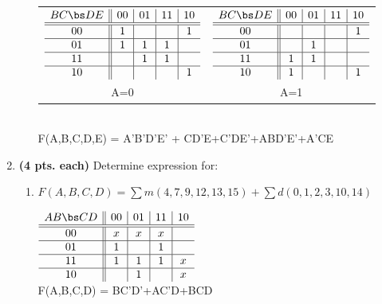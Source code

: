 \begin{enumerate}
\begin{enumerate}
\begin{solution}{
\begin{tabular}{cc}
$\begin{array} {c||c|c|c|c}
   B C \bs D E   & 00 & 01 & 11 & 10 \\ \hline \hline
       00        & 1  &    &    & 1  \\ \hline
       01        & 1  & 1  & 1  &    \\ \hline
       11        &    & 1  & 1  &    \\ \hline
       10        &    &    &    & 1  \\
\end{array}$ &
$\begin{array} {c||c|c|c|c}
   B C \bs D E   & 00 & 01 & 11 & 10 \\ \hline \hline
       00        &    &    &    & 1  \\ \hline
       01        &    & 1  &    &    \\ \hline
       11        & 1  & 1  &    &    \\ \hline
       10        & 1  &    &    & 1  \\
\end{array}$ \\
A=0 & A=1 \\
\end{tabular} \\
F(A,B,C,D,E) = A'B'D'E' + CD'E+C'DE'+ABD'E'+A'CE
} \end{solution}

\end{enumerate}

\item {\bf (4 pts. each)} Determine \SOPmin expression for:
\begin{enumerate}
\item $F(A,B,C,D)=\sum m(4,7,9,12,13,15)+\sum d(0,1,2,3,10,14)$

\begin{solution}{
$\begin{array} {c||c|c|c|c}
   A B \bs C D   & 00 & 01 & 11 & 10 \\ \hline \hline
       00        & x  & x  & x  &    \\ \hline
       01        & 1  &    & 1  &    \\ \hline
       11        & 1  & 1  & 1  & x  \\ \hline
       10        &    & 1  &    & x  \\
\end{array}$  \\
F(A,B,C,D) = BC'D'+AC'D+BCD
} \end{solution}


\end{enumerate}
\end{enumerate}
